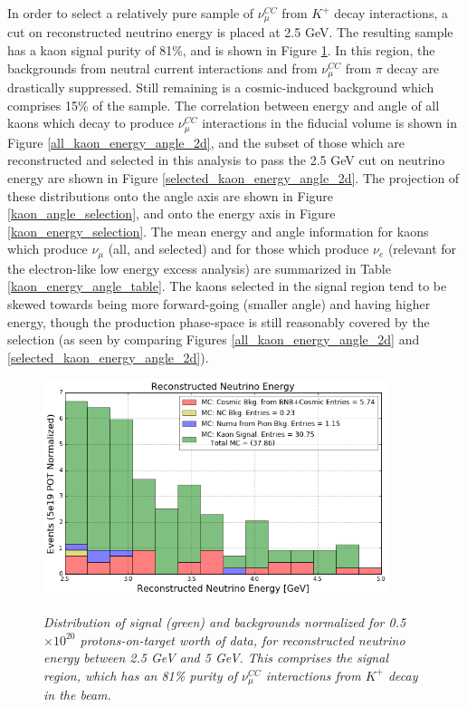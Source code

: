 In order to select a relatively pure sample of $\nu_\mu^{CC}$ from $K^+$ decay interactions, a cut on reconstructed neutrino energy is placed at 2.5 GeV. The resulting sample has a kaon signal purity of 81\%, and is shown in Figure \ref{kaon_stack_signal_nodata}. In this region, the backgrounds from neutral current interactions and from $\nu_\mu^{CC}$ from $\pi$ decay are drastically suppressed. Still remaining is a cosmic-induced background which comprises 15\% of the sample. The correlation between energy and angle of all kaons which decay to produce $\nu_\mu^{CC}$ interactions in the fiducial volume is shown in Figure \ref{all_kaon_energy_angle_2d}, and the subset of those which are reconstructed and selected in this analysis to pass the 2.5 GeV cut on neutrino energy are shown in Figure \ref{selected_kaon_energy_angle_2d}. The projection of these distributions onto the angle axis are shown in Figure \ref{kaon_angle_selection}, and onto the energy axis in Figure \ref{kaon_energy_selection}. The mean energy and angle information for kaons which produce $\nu_\mu$ (all, and selected) and for those which produce $\nu_e$ (relevant for the electron-like low energy excess analysis) are summarized in Table \ref{kaon_energy_angle_table}. The kaons selected in the signal region tend to be skewed towards being more forward-going (smaller angle) and having higher energy, though the production phase-space is still reasonably covered by the selection (as seen by comparing Figures \ref{all_kaon_energy_angle_2d} and \ref{selected_kaon_energy_angle_2d}).

%

\begin{figure}[ht!]
\centering
	\includegraphics[width=0.9\textwidth]{Figures/kaon_simonly_signal.png} \\
\caption{\textit{Distribution of signal (green) and backgrounds normalized for 0.5 $\times 10^{20}$ protons-on-target worth of data, for reconstructed neutrino energy between 2.5 GeV and 5 GeV. This comprises the signal region, which has an 81\% purity of $\nu_\mu^{CC}$ interactions from $K^+$ decay in the beam.}}\label{kaon_stack_signal_nodata}
\end{figure}


